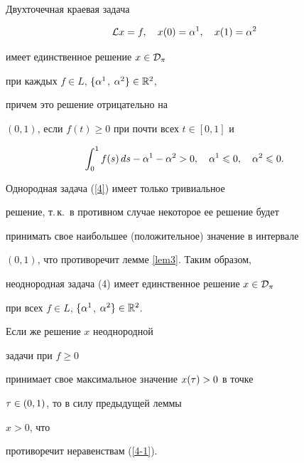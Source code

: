\begin{thm}


\label{th1}


Двухточечная краевая задача


\begin{equation}


\label{4}


\L x=f,\quad x(0)=\a^1,\q x(1)=\a^2


\end{equation}


имеет единственное решение $x\in{\cal D}_\pi$


при каждых $f\in L$, $\{\alpha^1$, $\alpha^2\}\in{\Bbb R}^2$,


причем это решение отрицательно на


$(0,1)$, если $f(t)\ge0$ при почти всех $t\in[0,1]$ и


\begin{equation}


\label{4-1}


\int_0^1f(s)\,ds-\a^1-\a^2>0,\q \a^1\le0,\q \a^2\le0.


\end{equation}


\end{thm}





\begin{pf}


Однородная задача (\ref{4}) имеет только тривиальное


решение, т.\,к.~в противном случае некоторое ее решение будет


принимать свое наибольшее (положительное) значение в интервале


$(0,1)$, что противоречит лемме \ref{lem3}. Таким образом,


неоднородная задача (4) имеет единственное решение $x\in{\cal D}_\pi$


при всех $f\in L$, $\{\alpha^1$, $\alpha^2\}\in{\Bbb R}^2$.


Если же решение $x$ неоднородной


задачи при $f\ge0$


принимает свое максимальное значение $x(\tau) > 0$ в точке


$\tau\in(0,1)$, то в силу предыдущей леммы


$x > 0$, что


противоречит неравенствам (\ref{4-1}).


\end{pf}








